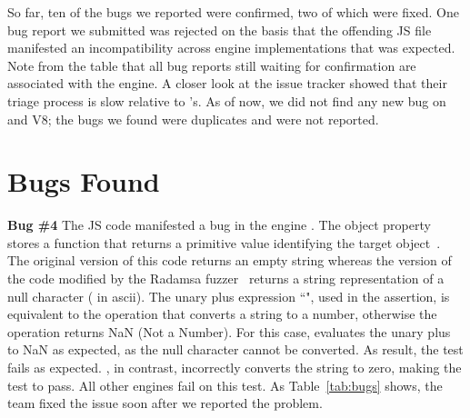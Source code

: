 \documentclass[10pt,conference,anonymous]{IEEEtran}
\begin{document}
So far, ten of the bugs we reported were confirmed, two of
which were fixed. One bug report we submitted was rejected on the
basis that the offending JS file manifested an incompatibility across
engine implementations that was expected.  Note from the table that
all bug reports still waiting for confirmation are associated with the
\jsc{} engine. A closer look at the \jsc{} issue tracker showed that
their triage process is slow relative to \chakra's. As of now, we did not find any
new bug on \smonkey{} and V8; the bugs we found were duplicates and
were not reported.




\section{Bugs Found}
\label{sec:bugs}

 

\sloppy
\vspace{1ex}\noindent\textbf{Bug \#4} The JS code   manifested a bug in the \js{} engine \chakra{}.
The object property  stores a function that returns a
primitive value identifying the target object~\cite{valueof}. The
original version of this code returns an empty string whereas the
version of the code modified by the Radamsa fuzzer~\cite{radamsa}
returns a string representation of a null character ( in ascii). The unary plus expression ``",
used in the assertion, is equivalent to the operation
 that converts a string to a number,
otherwise the operation returns NaN (Not a
Number)\cite{unary-plus}. For this case, \chakra{} evaluates the unary
plus to NaN as expected, as the null character cannot be converted. As
result, the test fails as expected. \chakra{}, in contrast,
incorrectly converts the string to zero, making the test to pass. All
other engines fail on this test. As Table~\ref{tab:bugs} shows, the
\chakra{} team fixed the issue soon after we reported the problem.
\end{document}
